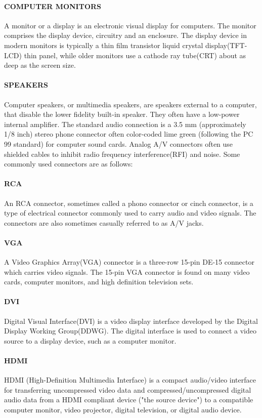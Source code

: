 \documentclass[a4paper,28pt]{report}
\begin{document}
	\paragraph{COMPUTER MONITORS}
	 A monitor or a display is an electronic visual display for computers. The monitor
	comprises the display device, circuitry and an enclosure. The display device in modern monitors is
	typically a thin film transistor liquid crystal display(TFT-LCD) thin panel, while older monitors use
	a cathode ray tube(CRT) about as deep as the screen size.
	\paragraph{SPEAKERS}
	 Computer speakers, or multimedia speakers, are speakers external to a computer, that disable
	the lower fidelity built-in speaker. They often have a low-power internal amplifier. The standard audio
	connection is a 3.5 mm (approximately 1/8 inch) stereo phone connector often color-coded lime green
	(following the PC 99 standard) for computer sound cards. Analog A/V connectors often use shielded cables to
	inhibit radio frequency interference(RFI) and noise. Some commonly used connectors are as follows:
	 \paragraph{RCA}
	  An RCA connector, sometimes called a phono connector or cinch connector, is a type of electrical
	connector commonly used to carry audio and video signals. The connectors are also sometimes casually
	referred to as A/V jacks.
	\paragraph{VGA}
	 A Video Graphics Array(VGA) connector is a three-row 15-pin DE-15 connector which carries
	video signals. The 15-pin VGA connector is found on many video cards, computer monitors, and high
	definition television sets.
	\paragraph{DVI}
	 Digital Visual Interface(DVI) is a video display interface developed by the Digital Display Working
	Group(DDWG). The digital interface is used to connect a video source to a display device, such as
	a computer monitor.
	\paragraph{HDMI}
	 HDMI (High-Definition Multimedia Interface) is a compact audio/video interface for
	transferring uncompressed video data and compressed/uncompressed digital audio data from a HDMI compliant
	device ("the source device") to a compatible computer monitor, video projector, digital
	television, or digital audio device.
\end{document}

